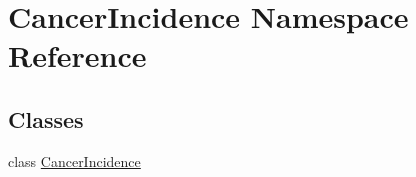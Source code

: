 \hypertarget{namespace_cancer_incidence}{}\section{Cancer\+Incidence Namespace Reference}
\label{namespace_cancer_incidence}
\subsection*{Classes}
\begin{DoxyCompactItemize}
\item 
class \hyperlink{class_cancer_incidence_1_1_cancer_incidence}{Cancer\+Incidence}
\end{DoxyCompactItemize}
